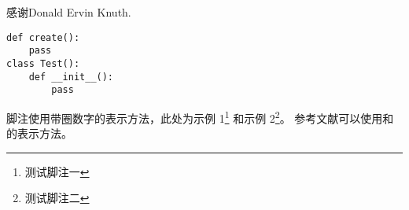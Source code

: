 
\begin{acknowledgement}
  感谢Donald Ervin Knuth.

\begin{center}
\begin{verbatim} 
def create():
    pass
class Test():
    def __init__():
        pass
\end{verbatim}  
\end{center}

脚注使用带圈数字的表示方法，此处为示例 1\footnote{测试脚注一} 和示例 2\footnote{测试脚注二}。
参考文献可以使用\cite{BUPT_Thesis_Format_2014}和的表示方法。

\end{acknowledgement}
